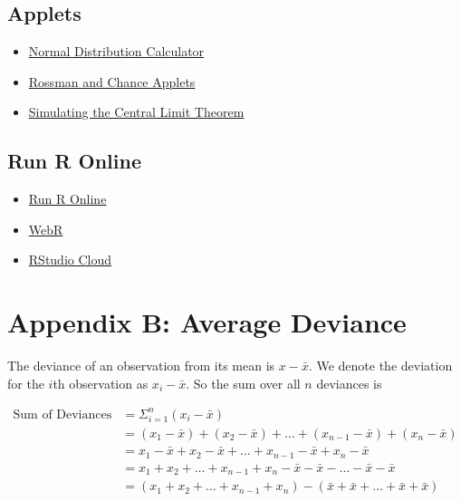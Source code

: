 \documentclass[
]{book}
\providecommand{\tightlist}{%
  \setlength{\itemsep}{0pt}\setlength{\parskip}{0pt}}
\begin{document}
\subsection*{Applets}\label{applets}

\begin{itemize}
\tightlist
\item
  \href{https://lgpcappiello.shinyapps.io/normcalc/}{Normal Distribution Calculator}
\item
  \href{http://www.rossmanchance.com/applets/}{Rossman and Chance Applets}
\item
  \href{https://lgpcappiello.shinyapps.io/SimulateCLT/}{Simulating the Central Limit Theorem}
\end{itemize}

\subsection*{Run R Online}\label{run-r-online}

\begin{itemize}
\tightlist
\item
  \href{https://rdrr.io/snippets/}{Run R Online}
\item
  \href{https://webr.r-wasm.org/latest/}{WebR}
\item
  \href{https://login.rstudio.cloud/}{RStudio Cloud}
\end{itemize}

\section*{Appendix B: Average Deviance}\label{appendix-b-average-deviance}

The deviance of an observation from its mean is \(x - \bar{x}\). We denote the deviation for the \(i\)th observation as \(x_i - \bar{x}\). So the sum over all \(n\) deviances is

\begin{align}
\text{Sum of Deviances} &= \Sigma_{i=1}^n (x_i - \bar{x}) \\
&= (x_1 - \bar{x}) + (x_2 - \bar{x}) + \dots + (x_{n-1} - \bar{x}) + (x_n - \bar{x}) \\
&= x_1 - \bar{x} + x_2 - \bar{x} + \dots + x_{n-1} - \bar{x} + x_n - \bar{x} \\
&= x_1 + x_2 + \dots + x_{n-1} + x_n - \bar{x} - \bar{x} - \dots - \bar{x} - \bar{x} \\
&= (x_1 + x_2 + \dots + x_{n-1} + x_n) - (\bar{x} + \bar{x} + \dots + \bar{x} + \bar{x})
\end{align}
\end{document}
